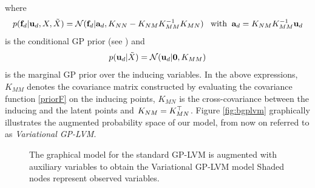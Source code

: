 where
\begin{align}
p(\mathbf{f}_d | \mathbf{u}_d,X,\tilde{X}) = \mathcal{N}(\mathbf{f}_d | \mathbf{a}_d, K_{NN} - K_{NM} K_{MM}^{-1} K_{MN})
 \; \; \; \text{with} \;\; \mathbf{a}_d = K_{NM}K^{-1}_{MM} \mathbf{u}_d \label{priorF2}
\end{align}
is the conditional GP prior (see \eg \citep{rasmussen-williams})
and 
\begin{equation}
\label{pfu}
p(\mathbf{u}_d|\tilde{X}) = \mathcal{N}(\mathbf{u}_d|\mathbf{0},K_{MM})
\end{equation}
is the marginal GP
prior over the inducing variables. In the above expressions, $K_{MM}$ denotes
the covariance matrix constructed by evaluating the covariance function \eqref{priorF}
on the inducing points, $K_{MN}$ is the cross-covariance between the inducing
and the latent points and $K_{NM} = K_{MN}^{\top}$.
Figure \ref{fig:bgplvm} graphically illustrates the augmented probability space of our model,
from now on referred to as \textit{Variational GP-LVM}.

\begin{figure}[ht]
\begin{center}
\hspace{0.1\textwidth}
\end{center}
\vspace{-8pt}
\caption{ \small{
The graphical model for the standard GP-LVM  is augmented with auxiliary variables to obtain the
Variational GP-LVM model  %
Shaded nodes represent
observed variables.}}
\label{fig:graphicalModels}
\end{figure}



